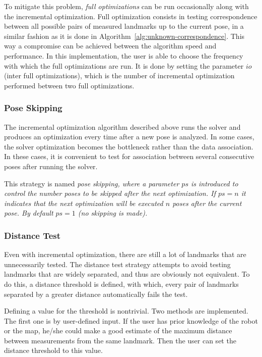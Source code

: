 To mitigate this problem, \emph{full optimizations} can be run occasionally along with the incremental optimization. Full optimization consists in testing correspondence between all possible pairs of measured landmarks up to the current pose, in a similar fashion as it is done in Algorithm~\ref{alg:unknown-correspondence}. This way a compromise can be achieved between the algorithm speed and performance. In this implementation, the user is able to choose the frequency with which the full optimizations are run. It is done by setting the parameter $io$ (inter full optimizations), which is the number of incremental optimization performed between two full optimizations. 

\subsubsection{Pose Skipping}

The incremental optimization algorithm described above runs the solver and produces an optimization every time after a new pose is analyzed. In some cases, the solver optimization becomes the bottleneck rather than the data association. In these cases, it is convenient to  test for association between several consecutive poses after running the solver.

This strategy is named \it{pose skipping}, where a parameter $ps$ is introduced to control the number poses to be skipped after the next optimization. If $ps=n$ it indicates that the next optimization will be executed $n$ poses after the current pose. By default $ps=1$ (no skipping is made).    

\subsubsection{Distance Test}

Even with incremental optimization, there are still a lot of landmarks that are unnecessarily tested. The distance test strategy attempts to avoid testing landmarks that are widely separated, and thus are obviously not equivalent. To do this, a distance threshold is defined, with which, every pair of landmarks separated by a greater distance automatically fails the test. 

Defining a value for the threshold is nontrivial. Two methods are implemented. The first one is by user-defined input. If the user has prior knowledge of the robot or the map, he/she could make a good estimate of the maximum distance between measurements from the same landmark. Then the user can set the distance threshold to this value.

